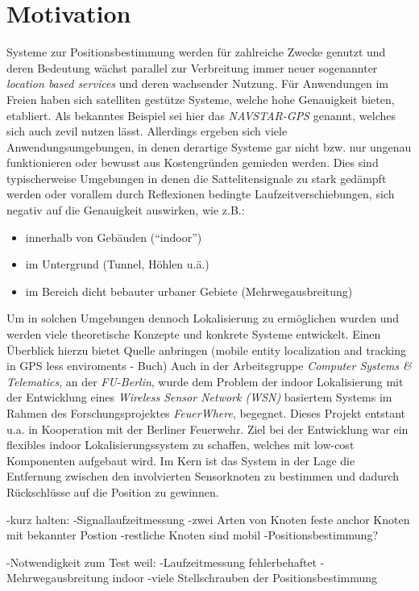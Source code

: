 \section{Motivation}
\label{sec:motivation}

Systeme zur Positionsbestimmung werden für zahlreiche Zwecke genutzt und deren Bedeutung wächst parallel zur
Verbreitung immer neuer sogenannter \textit{location based services} und deren wachsender Nutzung.
Für Anwendungen im Freien haben sich satelliten gestütze Systeme, welche hohe Genauigkeit bieten, etabliert.
Als bekanntes Beispiel sei hier das \textit{NAVSTAR-GPS} genannt, welches sich auch zevil nutzen lässt.
Allerdings ergeben sich viele Anwendungsumgebungen, in denen derartige Systeme gar nicht bzw.
nur ungenau funktionieren oder bewusst aus Kostengründen gemieden werden. 
Dies sind typischerweise Umgebungen in denen die Sattelitensignale zu stark gedämpft werden oder
vorallem durch Reflexionen bedingte Laufzeitverschiebungen, sich negativ auf die Genauigkeit auswirken, wie z.B.: 


\begin{itemize}
  \item innerhalb von Gebäuden (``indoor'')
  \item im Untergrund (Tunnel, Höhlen u.ä.)
  \item im Bereich dicht bebauter urbaner Gebiete (Mehrwegausbreitung)
\end{itemize}

Um in solchen Umgebungen dennoch Lokalisierung zu ermöglichen wurden und werden viele theoretische Konzepte und 
konkrete Systeme entwickelt. Einen Überblick hierzu bietet
Quelle anbringen (mobile entity localization and tracking in GPS less enviroments - Buch)
Auch in der Arbeitsgruppe \textit{Computer Systems & Telematics}, an der \textit{FU-Berlin}, 
wurde dem Problem der indoor Lokalisierung mit der Entwicklung eines \textit{Wireless Sensor Network (WSN)}
basiertem Systems im Rahmen des Forschungsprojektes \textit{FeuerWhere}, begegnet. 
Dieses Projekt entstant u.a. in Kooperation mit der Berliner Feuerwehr.
Ziel bei der Entwicklung war ein flexibles indoor Lokalisierungssystem zu schaffen, welches mit
low-cost Komponenten aufgebaut wird. 
Im Kern ist das System in der Lage die Entfernung zwischen den involvierten Sensorknoten zu bestimmen und 
dadurch Rückschlüsse auf die Position zu gewinnen.

-kurz halten:
-Signallaufzeitmessung
-zwei Arten von Knoten feste anchor Knoten mit bekannter Postion 
-restliche Knoten sind mobil
-Positionsbestimmung?

-Notwendigkeit zum Test weil:
  -Laufzeitmessung fehlerbehaftet
  -Mehrwegausbreitung indoor
  -viele Stellschrauben der Positionsbestimmung

